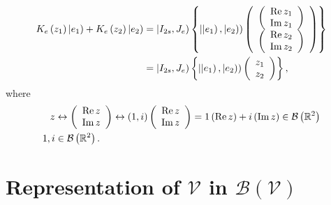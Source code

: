 \documentclass[aps,preprint]{revtex4}%
\begin{document}
\begin{align}
K_{e}\left(  z_{1}\right)  \left\vert e_{1}\right)  +K_{e}\left(
z_{2}\right)  \left\vert e_{2}\right)   &  =\left\vert I_{2s},J_{e}\right)
\left\{  \left\vert \left\vert e_{1}\right)  ,\left\vert e_{2}\right)
\right)  \left(
\begin{array}
[c]{c}%
\left(
\begin{array}
[c]{c}%
\operatorname{Re}z_{1}\\
\operatorname{Im}z_{1}%
\end{array}
\right) \\
\left(
\begin{array}
[c]{c}%
\operatorname{Re}z_{2}\\
\operatorname{Im}z_{2}%
\end{array}
\right)
\end{array}
\right)  \right\} \\
&  =\left\vert I_{2s},J_{e}\right)  \left\{  \left\vert \left\vert
e_{1}\right)  ,\left\vert e_{2}\right)  \right)  \left(
\begin{array}
[c]{c}%
z_{1}\\
z_{2}%
\end{array}
\right)  \right\}  ,
\end{align}
where
\begin{align}
z  &  \leftrightarrow\left(
\begin{array}
[c]{c}%
\operatorname{Re}z\\
\operatorname{Im}z
\end{array}
\right)  \leftrightarrow\left(  1,i\right)  \left(
\begin{array}
[c]{c}%
\operatorname{Re}z\\
\operatorname{Im}z
\end{array}
\right)  =1\left(  \operatorname{Re}z\right)  +i\left(  \operatorname{Im}%
z\right)  \in\mathcal{B}\left(  \mathbb{R}^{2}\right) \\
1,i  &  \in\mathcal{B}\left(  \mathbb{R}^{2}\right)  .
\end{align}


\section{Representation of $\mathcal{V}$ in $\mathcal{B}\left(  \mathcal{V}%
\right)  $}
\end{document}
